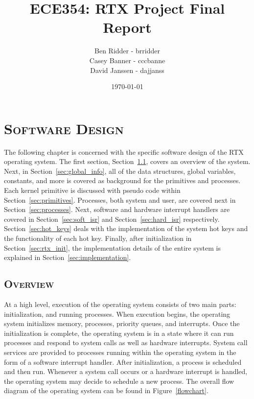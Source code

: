 \documentclass[oneside]{report}
\begin{document}
\lstset{language=C, 
        frame=single, 
        breaklines=true,
        basicstyle=\small\ttfamily,
        columns=fullflexible}


\title{ECE354: RTX Project Final Report}
\author{Ben Ridder - brridder \\
Casey Banner - cccbanne \\
David Janssen - dajjanss }
\date{\today}

\maketitle

\tableofcontents
\listoftables
\listoffigures
\lstlistoflistings

\chapter{\textsc{Software Design}}
The following chapter is concerned with the specific software design of the
RTX operating system. The first section, Section~\ref{sec:overview}, covers an
overview of the system. Next, in Section~\ref{sec:global_info}, all of the data
structures, global variables, constants, and more is covered as background for
the primitives and processes. Each kernel primitive is discussed with pseudo
code within Section~\ref{sec:primitives}. Processes, both system and user, are
covered next in Section~\ref{sec:processes}. Next, software and hardware
interrupt handlers are covered in Section~\ref{sec:soft_isr} and
Section~\ref{sec:hard_isr} respectively. Section~\ref{sec:hot_keys} deals with
the implementation of the system hot keys and the functionality of each hot
key. Finally, after initialization in Section~\ref{sec:rtx_init}, the implementation
details of the entire system is explained in Section~\ref{sec:implementation}.

\section{\textsc{Overview}}
\label{sec:overview}

At a high level, execution of the operating system consists of two
main parts: initialization, and running processes. When execution
begins, the operating system initializes memory, processes, priority
queues, and interrupts. Once the initialization is complete, the
operating system is in a state where it can run processes and respond
to system calls as well as hardware interrupts. System call services
are provided to processes running within the operating system in the
form of a software interrupt handler. After initialization, a process
is scheduled and then run. Whenever a system call occurs or a hardware
interrupt is handled, the operating system may decide to schedule a
new process. The overall flow diagram of the operating system can be
found in Figure~\ref{flowchart}.
\end{document}
